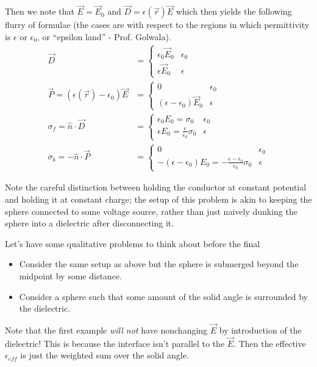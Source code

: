 \documentclass[10pt]{report}
\begin{document}
Then we note that $\vec{E} = \vec{E}_0$ and $\vec{D} = \epsilon(\vec{r})\vec{E}$ which then yields the following flurry of formulae (the cases are with respect to the regions in which permittivity is $\epsilon$ or $\epsilon_0$, or ``epsilon land'' - Prof. Golwala).
\begin{align}
    \vec{D} &= \begin{cases}\epsilon_0 \vec{E}_0 & \epsilon_0\\ \epsilon \vec{E}_0 & \epsilon\end{cases}\\
    \vec{P} = (\epsilon(\vec{r}) - \epsilon_0)\vec{E} &= \begin{cases}0 & \epsilon_0 \\ (\epsilon - \epsilon_0)\vec{E}_0&\epsilon\end{cases}\\
    \sigma_f = \hat{n}\cdot \vec{D} &= \begin{cases}\epsilon_0E_0 = \sigma_0 & \epsilon_0\\ \epsilon E_0 = \frac{\epsilon}{\epsilon_0}\sigma_0 & \epsilon\end{cases}\\
    \sigma_b = -\hat{n}\cdot \vec{P} &= \begin{cases} 0 & \epsilon_0 \\ -\left( \epsilon - \epsilon_0 \right)E_0 = -\frac{\epsilon - \epsilon_0}{\epsilon_0} \sigma_0 & \epsilon\end{cases}
\end{align}

Note the careful distinction between holding the conductor at constant potential and holding it at constant charge; the setup of this problem is akin to keeping the sphere connected to some voltage source, rather than just naively dunking the sphere into a dielectric after disconnecting it. 

Let's have some qualitative problems to think about before the final
\begin{itemize}
    \item Consider the same setup as above but the sphere is submerged beyond the midpoint by some distance.
    \item Consider a sphere such that some amount of the solid angle is surrounded by the dielectric.
\end{itemize}

Note that the first example \emph{will not} have nonchanging $\vec{E}$ by introduction of the dielectric! This is because the interface isn't parallel to the $\vec{E}$. Then the effective $\epsilon_{eff}$ is just the weighted sum over the solid angle. 
\end{document}
